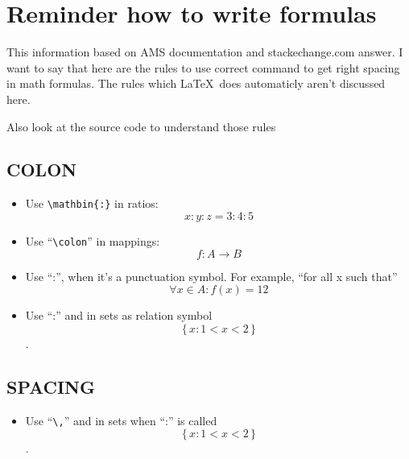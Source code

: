 \documentclass[a5paper,openany,9pt]{extbook}
\begin{document}
\chapter*{Reminder how to write formulas}

This information based on AMS documentation and stackechange.com answer. I want to say that here are the rules to use correct command to get right spacing in math formulas. The rules which \LaTeX\ does automaticly aren't discussed here.

Also look at the source code to understand those rules

\section{COLON}

\begin{itemize}
\item
Use \verb|\mathbin{:}| in ratios:
$$x\mathbin{:}y\mathbin{:}z = 3\mathbin{:}4\mathbin{:}5$$

\item
Use ``\verb=\colon='' in mappings:
$$f\colon A \to B$$

\item
Use ``:'', when it's a punctuation symbol. For example, ``for all x such that''
$$\forall x \in A\colon f(x) = 12$$

\item
Use ``:'' and in sets as relation symbol
$$\{\,x : 1 < x < 2\,\}$$.

\end{itemize}
	
\section{SPACING}

\begin{itemize}
\item
Use ``\verb=\,='' and in sets when ``:'' is called
$$\{\,x : 1 < x < 2\,\}$$.
\end{itemize}
\end{document}
